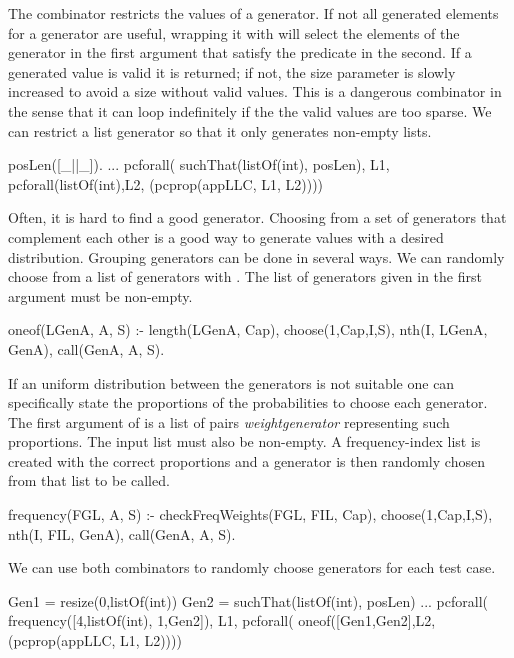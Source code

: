 The  combinator restricts the values of a generator.
%
If not all generated elements for a generator are useful, wrapping it
with  will select the elements of the generator in the
first argument that satisfy the predicate in the second.
%
If a generated value is valid it is returned; if not, the size parameter is
slowly increased to avoid a size without valid values.
%
This is a dangerous combinator in the sense that it can loop
indefinitely  if the the valid values are too sparse.
%
We can restrict a list generator so that it only generates non-empty
lists.
%
\begin{yapcode}
 posLen([_||_]).
 ...
   pcforall(  suchThat(listOf(int), posLen),  L1,
     pcforall(listOf(int),L2, (pcprop({appLLC, L1, L2}))))
\end{yapcode}

                                                        


Often, it is hard to find a good generator.
%
Choosing from a set of generators that complement each other
is a good way to generate values with a desired distribution.
%
Grouping generators can be done in several ways.
%
We can randomly choose from a list of generators with .
%
The list of generators given in the first argument must be non-empty.
%
\begin{yapcode}
 oneof(LGenA, A, S) :- length(LGenA, Cap), choose(1,Cap,I,S),
   nth(I, LGenA, GenA), call(GenA, A, S).
\end{yapcode}
%
If an uniform distribution between the generators is not suitable one can
specifically state the proportions of the probabilities to choose each
generator.
%
The first argument of  is a list of pairs
\yap{\{}\emph{weight}\yap{,}\emph{generator}\yap{\}} representing such
proportions.
%
The input list must also be non-empty.
%
A frequency-index list is created with the correct proportions and a
generator is then randomly chosen from that list to be called.
%
\begin{yapcode}
 frequency(FGL, A, S) :- checkFreqWeights(FGL, FIL, Cap),
   choose(1,Cap,I,S), nth(I, FIL, GenA), call(GenA, A, S).
\end{yapcode}
%
We can use both combinators to randomly choose generators for each test case.
%
\begin{yapcode}
 Gen1 = resize(0,listOf(int))
 Gen2 = suchThat(listOf(int), posLen)
 ...
   pcforall( frequency([{4,listOf(int)}, {1,Gen2}]),  L1,
     pcforall( oneof([Gen1,Gen2],L2, (pcprop({appLLC, L1, L2}))))
\end{yapcode}






